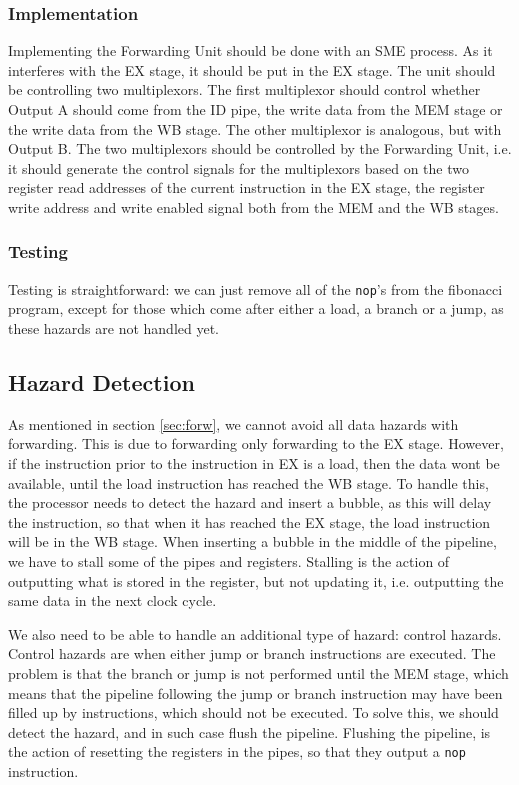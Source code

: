 \subsubsection*{Implementation}
Implementing the Forwarding Unit should be done with an SME process. As it
interferes with the EX stage, it should be put in the EX stage. The unit should
be controlling two multiplexors. The first multiplexor should control whether
Output A should come from the ID pipe, the write data from the MEM stage or the
write data from the WB stage. The other multiplexor is analogous, but with
Output B. The two multiplexors should be controlled by the Forwarding Unit,
i.e. it should generate the control signals for the multiplexors based on the
two register read addresses of the current instruction in the EX stage, the
register write address and write enabled signal both from the MEM and the WB
stages.

\subsubsection*{Testing}
Testing is straightforward: we can just remove all of the \texttt{nop}'s from
the fibonacci program, except for those which come after either a load, a
branch or a jump, as these hazards are not handled yet.

\subsection{Hazard Detection}\label{sec:haz}
As mentioned in section \ref{sec:forw}, we cannot avoid all data hazards with
forwarding. This is due to forwarding only forwarding to the EX stage. However,
if the instruction prior to the instruction in EX is a load, then the data wont
be available, until the load instruction has reached the WB stage. To handle
this, the processor needs to detect the hazard and insert a bubble, as this
will delay the instruction, so that when it has reached the EX stage, the load
instruction will be in the WB stage. When inserting a bubble in the middle of
the pipeline, we have to stall some of the pipes and registers. Stalling is the
action of outputting what is stored in the register, but not updating it, i.e.
outputting the same data in the next clock cycle.

We also need to be able to handle an additional type of hazard: control
hazards. Control hazards are when either jump or branch instructions are
executed. The problem is that the branch or jump is not performed until the MEM
stage, which means that the pipeline following the jump or branch instruction
may have been filled up by instructions, which should not be executed. To solve
this, we should detect the hazard, and in such case flush the pipeline.
Flushing the pipeline, is the action of resetting the registers in the pipes,
so that they output a \texttt{nop} instruction.

